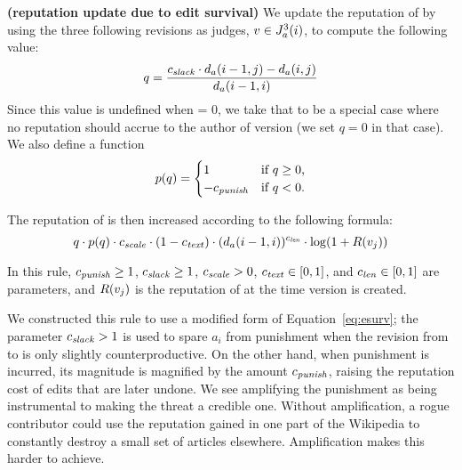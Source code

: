 \begin{regola}
\textbf{(reputation update due to edit survival)}
\label{rule-edit}
  We update the reputation of  by
  using the three following revisions as judges,
  $v \in J_{a}^{3}(i)$, to compute the following value:
\begin{equation*}
q = \frac{\slack \cdot \dist{a}{i-1,j} - \dist{a}{i,j}}
                        {\dist{a}{i-1,i}}
\label{eq-edit-long}
\end{equation*}
Since this value is undefined when  = 0,
we take that to be a special case where no reputation
should accrue to the author of version 
(\ie we set $q = 0$ in that case).
We also define a  function
\begin{equation*}
    p(q) =
        \begin{cases}
            1 & \text{if $q \ge 0$,} \\
            -{c_{{\text{\textit{punish}}}}} & \text{if $q < 0$.} \\
        \end{cases}
\end{equation*}

The reputation of  is then increased
according to the following formula:
\begin{equation*}
q \cdot p(q) 
  \cdot {c_{{\text{\textit{scale}}}}} \cdot (1 - {c_{{\text{\textit{text}}}}}) \cdot 
        (d_{a}(i-1,i))^{c_{{\text{\textit{len}}}}} \cdot \log(1 + R(v_{j}))
\end{equation*}

  In this rule, ${c_{{\text{\textit{punish}}}}} \geq 1$, ${c_{{\text{\textit{slack}}}}} \geq 1$, ${c_{{\text{\textit{scale}}}}} > 0$, 
  ${c_{{\text{\textit{text}}}}} \in [0,1]$, and ${c_{{\text{\textit{len}}}}} \in [0,1]$ are parameters,
  and $R(v_{j})$ is the reputation of 
  at the time version  is created.
\end{regola}

We constructed this rule to use a modified form of
Equation~\ref{eq:esurv};
the parameter ${c_{{\text{\textit{slack}}}}} > 1$ is used to spare $a_i$ from punishment when
the revision from  to  is only slightly
counterproductive.
On the other hand, when punishment is incurred, its magnitude is
magnified by the amount ${c_{{\text{\textit{punish}}}}}$, raising the reputation cost of
edits that are later undone. 
We see amplifying the punishment as being instrumental
to making the threat a credible one. 
Without amplification, a rogue contributor could use the reputation
gained in one part of the Wikipedia to constantly destroy a small set
of articles elsewhere.
Amplification makes this harder to achieve. 

